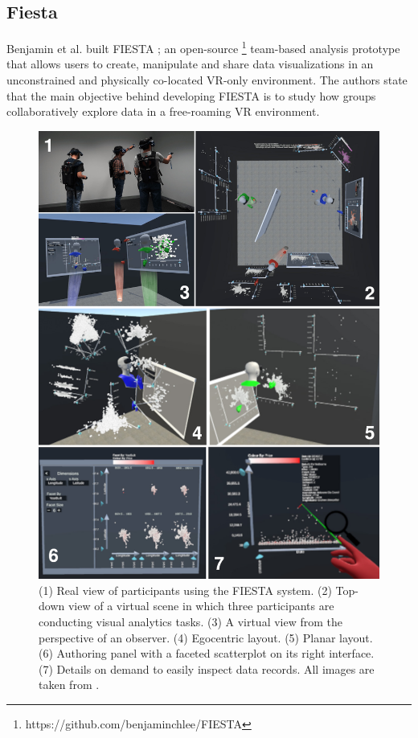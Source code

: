 \documentclass{vgtc}                          %
\begin{document}
\subsection{Fiesta}

\noindent Benjamin et al. built FIESTA \cite{fiesta_prototype}; an open-source
\footnote{https://github.com/benjaminchlee/FIESTA} team-based analysis
prototype that allows users to create, manipulate and share data visualizations
in an unconstrained and physically co-located VR-only environment. The authors
state that the main objective behind developing FIESTA is to study how groups
collaboratively explore data in a free-roaming VR environment.

\medskip

\begin{figure}[tb]
	\centering
	\includegraphics[width=\columnwidth]{fiesta}
	\caption{(1) Real view of participants using the FIESTA system. (2)
		Top-down view of a virtual scene in which three participants are
		conducting visual analytics tasks. (3) A virtual view from the perspective of an
		observer. (4) Egocentric layout. (5) Planar layout. (6) Authoring panel
		with a faceted scatterplot on its right interface. (7) Details on
		demand to easily inspect data records. All images are taken from
		\cite{fiesta_prototype}.}
	\label{fig:fiesta}
\end{figure}
\end{document}
